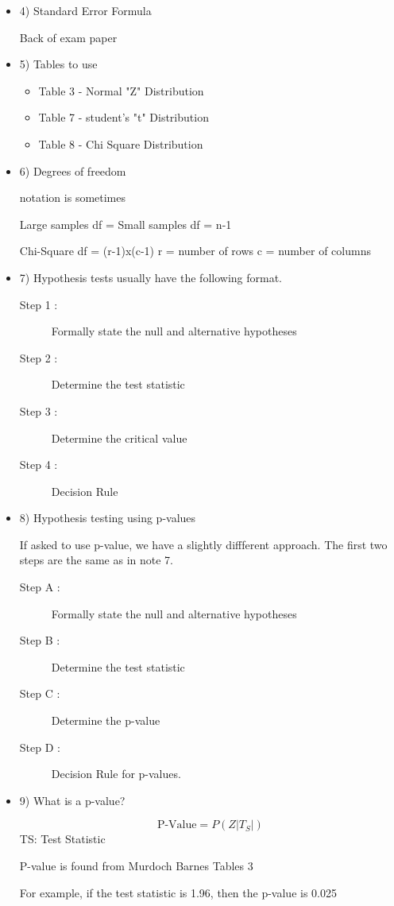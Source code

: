 \documentclass[]{report}
\begin{document}
{\begin{itemize}
\item4) Standard Error Formula

Back of exam paper

\item5) Tables to use
\begin{itemize}
\item Table 3 - Normal "Z" Distribution
\item Table 7 - student's "t" Distribution
\item Table 8 - Chi Square Distribution
\end{itemize}


\item6) Degrees of freedom

notation is sometimes 

Large samples    df = 
Small samples    df = n-1

Chi-Square        df = (r-1)x(c-1)
r  = number of rows
c =  number of columns

\item7) Hypothesis tests usually have the following format.

\begin{description}
\item[Step 1 :] Formally state the null and alternative hypotheses
\item[Step 2 :] Determine the test statistic
\item[Step 3 :] Determine the critical value
\item[Step 4 :] Decision Rule
\end{description}


\item8) Hypothesis testing using p-values

If asked to use p-value, we have a slightly diffferent approach.
The first two steps are the same as in note 7.

\begin{description}
\item[Step A :] Formally state the null and alternative hypotheses

\item[Step B :] Determine the test statistic
\item[Step C :] Determine the p-value
\item[Step D :] Decision Rule for p-values.
\end{description}
\item9)  What is a p-value?

\[\mbox{P-Value} = P(Z|T_S|)\]   TS: Test Statistic

P-value  is found from Murdoch Barnes Tables 3

For example, if the test statistic is 1.96, then the p-value is 0.025


\end{itemize}}
\end{document}
